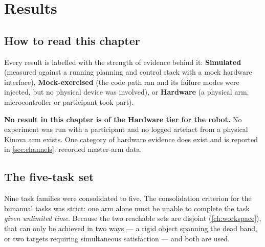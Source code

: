 \chapter{Results}
\label{ch:results}

\section{How to read this chapter}

Every result is labelled with the strength of evidence behind it:
\textbf{Simulated} (measured against a running planning and control stack with
a mock hardware interface), \textbf{Mock-exercised} (the code path ran and its
failure modes were injected, but no physical device was involved), or
\textbf{Hardware} (a physical arm, microcontroller or participant took part).

\textbf{No result in this chapter is of the Hardware tier for the robot.} No
experiment was run with a participant and no logged artefact from a physical
Kinova arm exists. One category of hardware evidence does exist and is
reported in \cref{sec:channels}: recorded master-arm data.

\section{The five-task set}

Nine task families were consolidated to five. The consolidation criterion for
the bimanual tasks was strict: one arm alone must be unable to complete the
task \emph{given unlimited time}. Because the two reachable sets are disjoint
(\cref{ch:workspace}), that can only be achieved in two ways --- a rigid object
spanning the dead band, or two targets requiring simultaneous satisfaction ---
and both are used.

